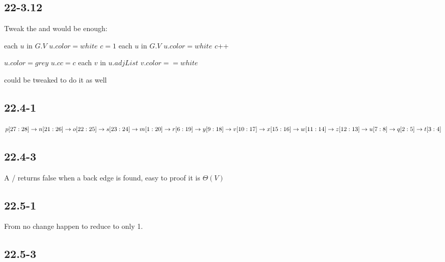 \documentclass[]{article}
\begin{document}
\subsection{22-3.12}

Tweak the  and  would be enough:

\begin{codebox}
	
	\li	\For each $u$ in $G.V$
	\li \Do $u.color = white$
	\End
	\li $c=1$
	\li	\For each $u$ in $G.V$
	\li \Do \If $u.color = white$
	\li \Then {}
	\li $c$++
	\End
	\End
	
\end{codebox}

\begin{codebox}
	
	\li $u.color = grey$
	\li $u.cc = c$
	\li	\For each $v$ in $u.adjList$
	\li \Do \If $v.color == white$
	\li 	\Then {}
	\End
	\End
	
\end{codebox}

 could be tweaked to do it as well

\subsection{22.4-1}

$ p[27:28] \rightarrow n[21:26] \rightarrow o[22:25] \rightarrow s[23:24] \rightarrow\\
 m[1:20] \rightarrow r[6:19] \rightarrow y[9:18] \rightarrow v[10:17] \rightarrow x[15:16] \rightarrow \\
w[11:14] \rightarrow z[12:13] \rightarrow u[7:8] \rightarrow q[2:5] \rightarrow t[3:4]$

\subsection{22.4-3}
A / returns false when a back edge is found, easy to proof it is $\Theta (V)$

\subsection{22.5-1}
From no change happen to reduce to only 1.

\subsection{22.5-3}
\end{document}
